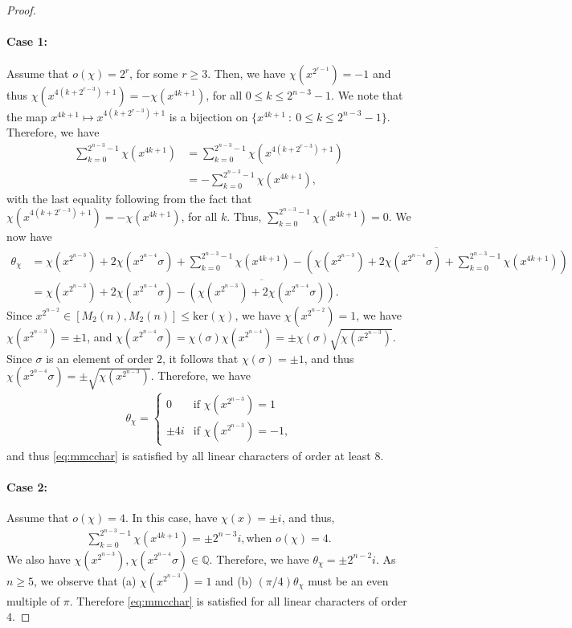 \documentclass{amsart}
\theoremstyle{plain}
\theoremstyle{remark}\newtheorem{con}[theorem]{Construction}
\theoremstyle{remark} \newtheorem*{remark}{Remark}
\theoremstyle{remark} \newtheorem{example}{Example}
\newcommand{\bb}{\mathbb}
\newcommand{\mrm}{\mathrm}
\newcommand{\ov}{\overline}
\begin{document}
\begin{proof}
\paragraph{Case 1:} Assume that $o(\chi)=2^{r}$, for some $r\geq 3$. Then, we have $\chi(x^{2^{r-1}})=-1$ and thus $\chi(x^{4(k+2^{r-3})+1})=-\chi(x^{4k+1})$, for all $0\leq k \leq 2^{n-3}-1$. We note that the map $x^{4k+1} \mapsto x^{4(k+2^{r-3})+1}$ is a bijection on $\{x^{4k+1}\ :\ 0\leq k \leq 2^{n-3}-1 \}$. Therefore, we have 
 \begin{align*}
  \sum\limits_{k=0}^{2^{n-3}-1} \chi(x^{4k+1}) & = \sum\limits_{k=0}^{2^{n-3}-1} \chi(x^{4(k+2^{r-3})+1})\\
  & = -\sum\limits_{k=0}^{2^{n-3}-1} \chi(x^{4k+1}),
 \end{align*}
 with the last equality following from the fact that $\chi(x^{4(k+2^{r-3})+1})=-\chi(x^{4k+1})$, for all $k$. Thus, $\sum\limits_{k=0}^{2^{n-3}-1} \chi(x^{4k+1})=0$.
 We now have
\begin{align*}
\theta_{\chi} &= \chi(x^{2^{n-3}}) + 2\chi(x^{2^{n-4}} \sigma) + \sum\limits_{k=0}^{2^{n-3}-1} \chi(x^{4k+1})- \ov{\left(\chi(x^{2^{n-3}}) + 2\chi(x^{2^{n-4}} \sigma) + \sum\limits_{k=0}^{2^{n-3}-1} \chi(x^{4k+1}) \right)} \\
& = \chi(x^{2^{n-3}}) + 2\chi(x^{2^{n-4}} \sigma) -\ov{ \left( \chi(x^{2^{n-3}}) + 2\chi(x^{2^{n-4}} \sigma) \right) }.
\end{align*}
Since $x^{2^{n-2}} \in [M_{2}(n), M_{2}(n)] \leq \mrm{ker}(\chi)$, we have  $\chi(x^{2^{n-2}})=1$, we have  $\chi(x^{2^{n-3}})=\pm 1$, and $\chi(x^{2^{n-4}} \sigma)= \chi(\sigma) \chi(x^{2^{n-4}})=\pm\chi(\sigma)\sqrt{\chi(x^{2^{n-3}})}$. Since $\sigma$ is an element of order $2$, it follows that $\chi(\sigma)=\pm 1$, and thus $\chi(x^{2^{n-4}} \sigma)= \pm \sqrt{\chi(x^{2^{n-3}})}$. Therefore, we have
\begin{align*}
 \theta_{\chi} = \begin{cases}
 0 & \text{if $\chi(x^{2^{n-3}})=1$} \\
  \pm 4 i & \text{if $\chi(x^{2^{n-3}})=-1$,}
 \end{cases}
\end{align*}
and thus \eqref{eq:mmcchar} is satisfied by all linear characters of order at least $8$.

\paragraph{Case 2:} Assume that $o(\chi) =4$. In this case, have $\chi(x)=\pm i$, and thus, 
\begin{align}\label{eq:order4}
     \sum\limits_{k=0}^{2^{n-3}-1} \chi(x^{4k+1})= \pm 2^{n-3} i, \text{when $o(\chi)=4$}. 
 \end{align}
We also have $\chi(x^{2^{n-3}}), \chi(x^{2^{n-4}} \sigma) \in \bb{Q}$. Therefore, we have $\theta_{\chi}= \pm 2^{n-2} i$. As $n\geq 5$, we observe that (a) $\chi(x^{2^{n-3}})=1$ and (b) $(\pi/4)\theta_{\chi}$ must be an even multiple of $\pi$. Therefore \eqref{eq:mmcchar} is satisfied for all linear characters of order $4$.


\end{proof}
\end{document}
